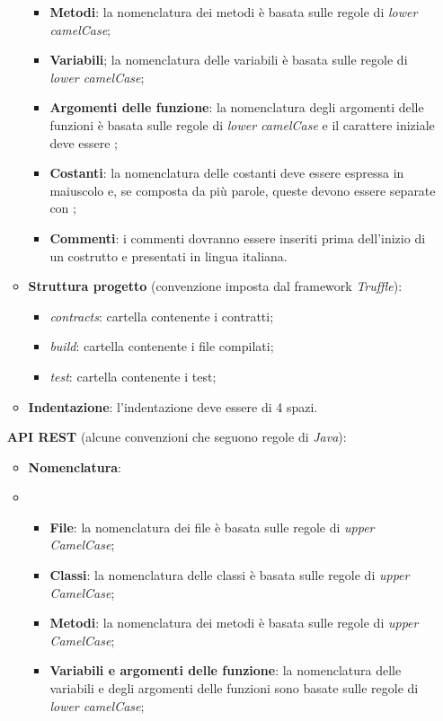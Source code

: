\begin{itemize}
\begin{itemize}
\begin{itemize}
            \item \textbf{Metodi}: la nomenclatura dei metodi è basata sulle regole di \textit{lower camelCase};
            \item \textbf{Variabili}; la nomenclatura delle variabili è basata sulle regole di \textit{lower camelCase};
            \item \textbf{Argomenti delle funzione}: la nomenclatura degli argomenti delle funzioni è basata sulle regole di \textit{lower camelCase} e il carattere iniziale deve essere \textit{\textunderscore};
            \item \textbf{Costanti}: la nomenclatura delle costanti deve essere espressa in maiuscolo e, se composta da più parole, queste devono essere separate con \textit{\textunderscore};
            \item \textbf{Commenti}: i commenti dovranno essere inseriti prima dell'inizio di un  costrutto e presentati in lingua italiana.
        \end{itemize}
        \item \textbf{Struttura progetto} (convenzione imposta dal framework \textit{Truffle}):
        \begin{itemize}
            \item \textit{contracts}: cartella contenente i contratti;
            \item \textit{build}: cartella contenente i file compilati;
            \item \textit{test}: cartella contenente i test;
        \end{itemize}
        \item \textbf{Indentazione}: l'indentazione deve essere di 4 spazi.
    \end{itemize}
    \textbf{API REST} (alcune convenzioni che seguono regole di \textit{Java}):
    \begin{itemize}
        \item \textbf{Nomenclatura}:
        \item \begin{itemize}
            \item \textbf{File}: la nomenclatura dei file è basata sulle regole di \textit{upper CamelCase};
            \item \textbf{Classi}: la nomenclatura delle classi è basata sulle regole di \textit{upper CamelCase};
            \item \textbf{Metodi}: la nomenclatura dei metodi è basata sulle regole di \textit{upper CamelCase};
            \item \textbf{Variabili e argomenti delle funzione}: la nomenclatura delle variabili e degli argomenti delle funzioni sono basate sulle regole di \textit{lower camelCase};

\end{itemize}
\end{itemize}
\end{itemize}
